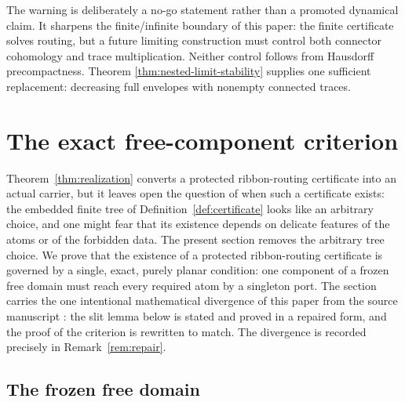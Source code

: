 \documentclass[11pt,reqno]{amsart}
\theoremstyle{definition}
\theoremstyle{remark}
\begin{document}
The warning is deliberately a no-go statement rather than a promoted
dynamical claim.  It sharpens the finite/infinite boundary of this paper:
the finite certificate solves routing, but a future limiting construction
must control both connector cohomology and trace multiplication.  Neither
control follows from Hausdorff precompactness.  Theorem
\ref{thm:nested-limit-stability} supplies one sufficient replacement:
decreasing full envelopes with nonempty connected traces.


\section{The exact free-component criterion}\label{sec:criterion}

Theorem~\ref{thm:realization} converts a protected ribbon-routing certificate into an
actual carrier, but it leaves open the question of when such a certificate exists: the
embedded finite tree of Definition~\ref{def:certificate} looks like an arbitrary choice,
and one might fear that its existence depends on delicate features of the atoms or of the
forbidden data. The present section removes the arbitrary tree choice. We prove that the
existence of a protected ribbon-routing certificate is governed by a single, exact,
purely planar condition: one component of a frozen free domain must reach every required
atom by a singleton port. The section carries the one intentional mathematical divergence
of this paper from the source manuscript \cite{MWman}: the slit lemma below is stated and
proved in a repaired form, and the proof of the criterion is rewritten to match. The
divergence is recorded precisely in Remark~\ref{rem:repair}.

\subsection{The frozen free domain}\label{subsec:D-frozen}
\end{document}
